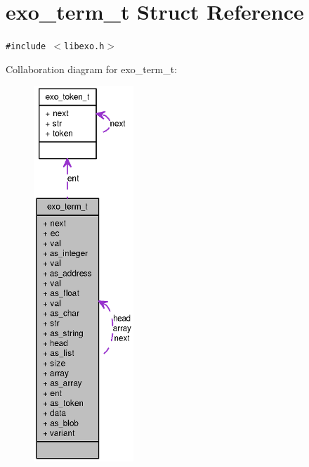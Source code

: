 \section{exo\_\-term\_\-t Struct Reference}
\label{structexo__term__t}
{\tt \#include $<$libexo.h$>$}

Collaboration diagram for exo\_\-term\_\-t:\nopagebreak
\begin{figure}[H]
\begin{center}
\leavevmode
\includegraphics[height=400pt]{structexo__term__t__coll__graph}
\end{center}
\end{figure}
